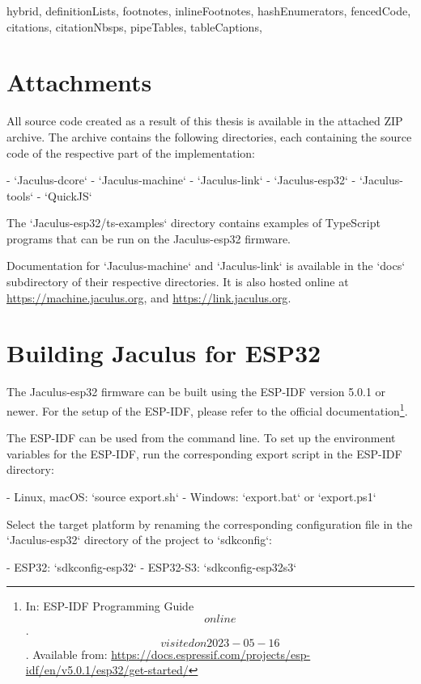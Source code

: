 \begin{markdown*}{%
  hybrid,
  definitionLists,
  footnotes,
  inlineFootnotes,
  hashEnumerators,
  fencedCode,
  citations,
  citationNbsps,
  pipeTables,
  tableCaptions,
}

\appendix

\chapter{Attachments}

All source code created as a result of this thesis is available in the attached ZIP archive. The archive contains the following directories, each containing the source code of the respective part of the implementation:

- `Jaculus-dcore`
- `Jaculus-machine`
- `Jaculus-link`
- `Jaculus-esp32`
- `Jaculus-tools`
- `QuickJS`

The `Jaculus-esp32/ts-examples` directory contains examples of TypeScript programs that can be run on the Jaculus-esp32 firmware.

Documentation for `Jaculus-machine` and `Jaculus-link` is available in the `docs` subdirectory of their respective directories. It is also hosted online at \url{https://machine.jaculus.org}, and \url{https://link.jaculus.org}.


\chapter{Building Jaculus for ESP32}

The Jaculus-esp32 firmware can be built using the ESP-IDF version 5.0.1 or newer. For the setup of the ESP-IDF, please refer to the official documentation\footnote{In: ESP-IDF Programming Guide \[online\]. \[visited on 2023-05-16\]. Available from: \url{https://docs.espressif.com/projects/esp-idf/en/v5.0.1/esp32/get-started/}}.

The ESP-IDF can be used from the command line. To set up the environment variables for the ESP-IDF, run the corresponding export script in the ESP-IDF directory:

- Linux, macOS: `source export.sh`
- Windows: `export.bat` or `export.ps1`

Select the target platform by renaming the corresponding configuration file in the `Jaculus-esp32` directory of the project to `sdkconfig`:

- ESP32: `sdkconfig-esp32`
- ESP32-S3: `sdkconfig-esp32s3`


\end{markdown*}

